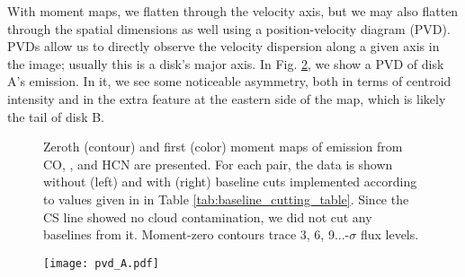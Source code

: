With moment maps, we flatten through the velocity axis, but we may also flatten through the spatial dimensions as well using a position-velocity diagram (PVD). PVDs allow us to directly observe the velocity dispersion along a given axis in the image; usually this is a disk's major axis. In Fig. \ref{fig:pv_diag}, we show a PVD of disk A's \hco emission. In it, we see some noticeable asymmetry, both in terms of centroid intensity and in the extra feature at the eastern side of the map, which is likely the tail of disk B.


\begin{figure}[h]
  \hspace*{\fill}%
  \vfill%
  \vfill%
  \vfill%
  \hspace*{\fill}%
  \caption{Zeroth (contour) and first (color) moment maps of emission from CO, \hco, and HCN are presented. For each pair, the data is shown without (left) and with (right) baseline cuts implemented according to values given in in Table \ref{tab:baseline_cutting_table}. Since the CS line showed no cloud contamination, we did not cut any baselines from it. Moment-zero contours trace 3, 6, 9...-$\sigma$ flux levels.}
  \label{fig:baseline_cuts}
\end{figure}




\begin{figure}
  \centering
  \texttt{[image: pvd\_A.pdf]}
    \label{fig:pv_diag}
\end{figure}






